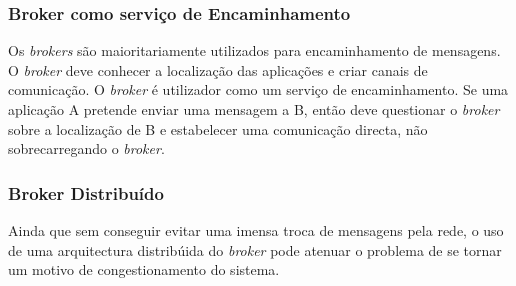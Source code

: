 \subsubsection{Broker como serviço de Encaminhamento}
Os \textit{brokers} são maioritariamente utilizados para encaminhamento de mensagens. O \textit{broker} deve conhecer a localização das aplicações e criar canais de comunicação. O \textit{broker} é utilizador como um serviço de encaminhamento. Se uma aplicação A pretende enviar uma mensagem a B, então deve questionar o \textit{broker} sobre a localização de B e estabelecer uma comunicação directa, não sobrecarregando o \textit{broker}.
\subsubsection{Broker Distribuído}
Ainda que sem conseguir evitar uma imensa troca de mensagens pela rede, o uso de uma arquitectura distribúida do \textit{broker} pode atenuar o problema de  se tornar um motivo de congestionamento do sistema.



